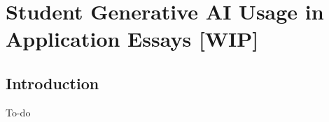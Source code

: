 

\chapter{\label{ch:studentuse}Student Generative AI Usage in Application Essays [WIP]}

\minitoc

\section{Introduction}
To-do

